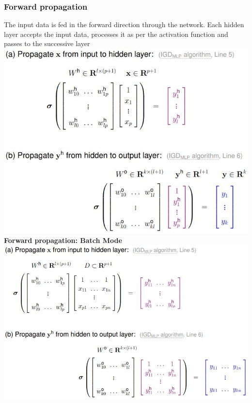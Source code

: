 \documentclass[11pt,a4paper]{article}
\begin{document}
\begin{flushleft}
\subsubsection{Forward propagation}
The input data is fed in the forward direction through the network. Each hidden layer accepts the input data, processes it as per the activation function and passes to the successive layer
\includegraphics[width=\textwidth]{forwardProp}
\textbf{Forward propagation: Batch Mode}
\includegraphics[width=\textwidth]{forwardPropBatch}

\end{flushleft}
\end{document}
